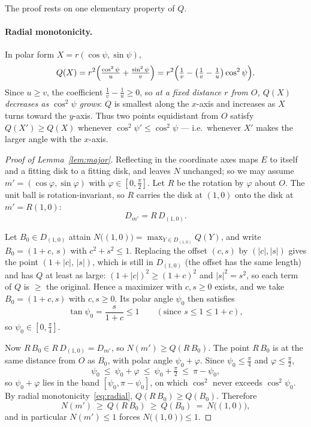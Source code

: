 \documentclass[11pt]{article}
\begin{document}
The proof rests on one elementary property of $Q$.

\paragraph{Radial monotonicity.} In polar form $X=r(\cos\psi,\sin\psi)$,
\begin{equation}\label{eq:radial}
  Q(X)=r^2\Bigl(\tfrac{\cos^2\psi}{u}+\tfrac{\sin^2\psi}{v}\Bigr)
       =r^2\Bigl(\tfrac1v-\bigl(\tfrac1v-\tfrac1u\bigr)\cos^2\psi\Bigr).
\end{equation}
Since $u\ge v$, the coefficient $\tfrac1v-\tfrac1u\ge0$, so \emph{at a fixed distance $r$ from $O$,
$Q(X)$ decreases as $\cos^2\psi$ grows}: $Q$ is smallest along the $x$-axis and increases as $X$ turns
toward the $y$-axis. Thus two points equidistant from $O$ satisfy $Q(X')\ge Q(X)$ whenever
$\cos^2\psi'\le\cos^2\psi$ --- i.e.\ whenever $X'$ makes the larger angle with the $x$-axis.

\begin{proof}[Proof of Lemma~\ref{lem:major}]
Reflecting in the coordinate axes maps $E$ to itself and a fitting disk to a fitting disk, and leaves
$N$ unchanged; so we may assume $m'=(\cos\varphi,\sin\varphi)$ with $\varphi\in[0,\tfrac\pi2]$. Let $R$
be the rotation by $\varphi$ about $O$. The unit ball is rotation-invariant, so $R$ carries the disk at
$(1,0)$ onto the disk at $m'=R(1,0)$:
\[
  D_{m'}=R\,D_{(1,0)} .
\]

Let $B_0\in D_{(1,0)}$ attain $N\bigl((1,0)\bigr)=\max_{Y\in D_{(1,0)}}Q(Y)$, and write
$B_0=(1+c,\,s)$ with $c^2+s^2\le1$. Replacing the offset $(c,s)$ by $(|c|,|s|)$ gives the point
$(1+|c|,\,|s|)$, which is still in $D_{(1,0)}$ (the offset has the same length) and has $Q$ at least as
large: $(1+|c|)^2\ge(1+c)^2$ and $|s|^2=s^2$, so each term of $Q$ is $\ge$ the original. Hence a
maximizer with $c,s\ge0$ exists, and we take $B_0=(1+c,s)$ with $c,s\ge0$. Its polar angle $\psi_0$
then satisfies
\[
  \tan\psi_0=\frac{s}{1+c}\le1\qquad(\text{since }s\le1\le1+c),
\]
so $\psi_0\in[0,\tfrac\pi4]$.

Now $R\,B_0\in R\,D_{(1,0)}=D_{m'}$, so $N(m')\ge Q(R\,B_0)$. The point $R\,B_0$ is at the same distance
from $O$ as $B_0$, with polar angle $\psi_0+\varphi$. Since $\psi_0\le\tfrac\pi4$ and $\varphi\le\tfrac\pi2$,
\[
  \psi_0\ \le\ \psi_0+\varphi\ \le\ \psi_0+\tfrac\pi2\ \le\ \pi-\psi_0 ,
\]
so $\psi_0+\varphi$ lies in the band $[\psi_0,\pi-\psi_0]$, on which $\cos^2$ never exceeds
$\cos^2\psi_0$. By radial monotonicity~\eqref{eq:radial}, $Q(R\,B_0)\ge Q(B_0)$. Therefore
\[
  N(m')\ \ge\ Q(R\,B_0)\ \ge\ Q(B_0)\ =\ N\bigl((1,0)\bigr),
\]
and in particular $N(m')\le1$ forces $N\bigl((1,0)\bigr)\le1$.
\end{proof}
\end{document}
